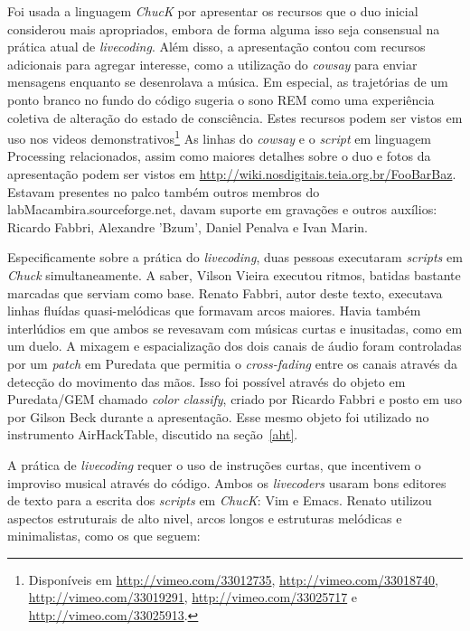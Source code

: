 Foi usada a linguagem \emph{ChucK} por apresentar os recursos que
o duo inicial considerou mais apropriados,
 embora de forma alguma isso seja
consensual na prática atual de \emph{livecoding}. Além disso, a apresentação
contou com recursos adicionais para agregar interesse, como a
utilização do \emph{cowsay} para enviar mensagens enquanto se
desenrolava a música. Em especial, as trajetórias de um ponto branco
no fundo do código sugeria o sono REM como uma experiência coletiva de alteração
do estado de consciência.
Estes recursos podem ser vistos
em uso nos videos demonstrativos\footnote{Disponíveis em
  \url{http://vimeo.com/33012735}, \url{http://vimeo.com/33018740},
  \url{http://vimeo.com/33019291}, \url{http://vimeo.com/33025717} e
  \url{http://vimeo.com/33025913}.}
  As linhas do \emph{cowsay} e o
\emph{script} em linguagem Processing relacionados, assim como maiores
detalhes sobre o duo e fotos da apresentação podem ser vistos em
\url{http://wiki.nosdigitais.teia.org.br/FooBarBaz}. Estavam presentes
no palco também outros membros do labMacambira.sourceforge.net, davam suporte em gravações e outros auxílios: Ricardo Fabbri,
Alexandre 'Bzum', Daniel Penalva e Ivan Marin.

Especificamente sobre a prática do \emph{livecoding},
duas pessoas executaram \emph{scripts} em \emph{Chuck} simultaneamente.
A saber, Vilson
Vieira executou ritmos, batidas bastante marcadas que serviam como
base. Renato Fabbri, autor deste texto, executava linhas
fluídas quasi-melódicas que formavam arcos maiores.
Havia também interlúdios em que ambos se
revesavam com músicas curtas e inusitadas, como em um duelo. A mixagem
e espacialização dos dois canais de áudio foram controladas por um
\emph{patch} em Puredata que permitia o \textit{cross-fading} entre os canais
através da detecção do movimento das mãos. Isso foi possível através
do objeto em Puredata/GEM chamado \emph{color classify}, criado por
Ricardo Fabbri e posto em uso por Gilson Beck durante a
apresentação. Esse mesmo objeto foi utilizado no instrumento
AirHackTable, discutido na seção~\ref{aht}.

A prática de \emph{livecoding} requer o uso de 
instruções curtas, que incentivem o improviso
musical através do código. Ambos os \emph{livecoders}
usaram bons editores de texto
para a escrita dos \emph{scripts} em \emph{ChucK}: Vim e Emacs.
Renato utilizou aspectos estruturais de alto nivel, 
arcos longos e estruturas
melódicas e minimalistas, como os que seguem:


